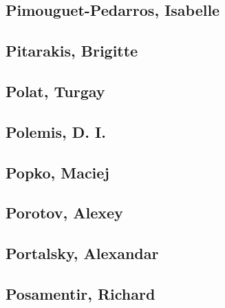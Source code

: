 \subsection[Pimouguet-Pedarros, Isabelle (1)]{Pimouguet-Pedarros, Isabelle}

\subsection[Pitarakis, Brigitte (1)]{Pitarakis, Brigitte}

\subsection[Polat, Turgay (1)]{Polat, Turgay}

\subsection[Polemis, D. I. (1)]{Polemis, D. I.}

\subsection[Popko, Maciej (1)]{Popko, Maciej}

\subsection[Porotov, Alexey (1)]{Porotov, Alexey}

\subsection[Portalsky, Alexandar (1)]{Portalsky, Alexandar}

\subsection[Posamentir, Richard (4)]{Posamentir, Richard}



